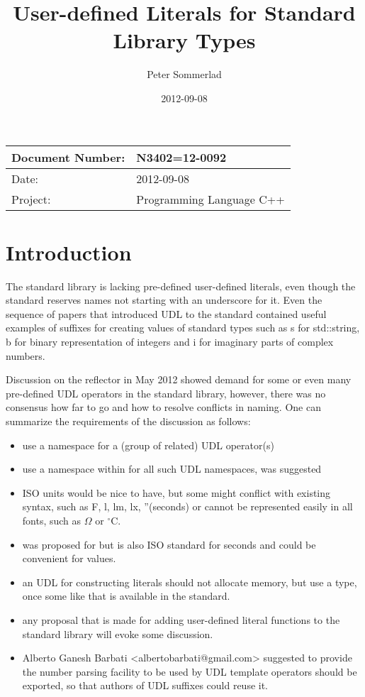 \documentclass[ebook,11pt,article]{memoir}
\title{User-defined Literals for Standard Library Types}
\author{Peter Sommerlad}
\date{2012-09-08}                                           %
\begin{document}
\maketitle
\begin{tabular}[t]{|l|l|}\hline 
Document Number: &  N3402=12-0092 \\\hline
Date: & 2012-09-08 \\\hline
Project: & Programming Language C++\\\hline 
\end{tabular}

\chapter{Introduction}
The standard library is lacking pre-defined user-defined literals, even though the standard reserves names not starting with an underscore for it. Even the sequence of papers that introduced UDL to the standard contained useful examples of suffixes for creating values of standard types such as s for std::string, b for binary representation of integers and i for imaginary parts of complex numbers.

Discussion on the reflector in May 2012 showed demand for some or even many pre-defined UDL operators in the standard library, however, there was no consensus how far to go and how to resolve conflicts in naming. One can summarize the requirements of the discussion as follows:
\begin{itemize}
\item use a namespace for a (group of related) UDL operator(s)
\item use a namespace within  for all such UDL namespaces,  was suggested
\item ISO units would be nice to have, but some might conflict with existing syntax, such as F, l, lm, lx, ''(seconds) or cannot be represented easily in all fonts, such as $\Omega$ or $^{\circ}\mathrm{C}$.
\item {} was proposed for  but is also ISO standard for seconds and could be convenient for  values.
\item an UDL for constructing  literals should not allocate memory, but use a  type, once some like that is available in the standard.
\item any proposal that is made for adding user-defined literal functions to the standard library will evoke some discussion.
\item Alberto Ganesh Barbati <albertobarbati@gmail.com> suggested to provide the number parsing facility to be used by UDL template operators should be exported, so that authors of UDL suffixes could reuse it.
\end{itemize}
\end{document}
